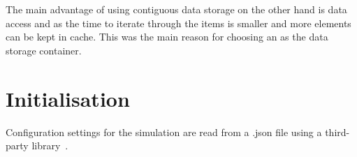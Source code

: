 The main advantage of using contiguous data storage on the other hand is data access and as the time to iterate through the items is smaller and more elements can be kept in cache. This was the main reason for choosing an \stdvector as the data storage container.
%
%
\section{Initialisation}
Configuration settings for the simulation are read from a .json file using a third-party \Cpp library~\cite{nlohmann}. 

